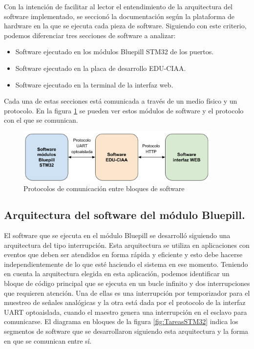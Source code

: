 Con la intención de facilitar al lector el entendimiento de la arquitectura del software implementado, se seccionó la documentación según la plataforma de hardware en la que se ejecuta cada pieza de software. Siguiendo con este criterio, podemos diferenciar tres secciones de software a analizar:
\begin{itemize}
	\item Software ejecutado en los módulos Bluepill STM32 de los puertos.
	\item Software ejecutado en la placa de desarrollo EDU-CIAA.
	\item Software ejecutado en la terminal de la interfaz web.
\end{itemize}
	
Cada una de estas secciones está comunicada a través de un medio físico y un protocolo. En la figura \ref{fig:ProtocolosComSoftware} se pueden ver estos módulos de software y el protocolo con el que se comunican.

\begin{figure}[H]
	\centering
	\includegraphics[width=0.9\textwidth]{./Figures/ProtocolosComSoftware.pdf}
	\caption{Protocolos de comunicación entre bloques de software}
	\label{fig:ProtocolosComSoftware}
\end{figure}

\subsection{Arquitectura del software del módulo Bluepill.}

El software que se ejecuta en el módulo Bluepill se desarrolló siguiendo una arquitectura del tipo interrupción. Esta arquitectura se utiliza en aplicaciones con eventos que deben ser atendidos en forma rápida y eficiente y esto debe hacerse independientemente de lo que esté haciendo el sistema en ese momento\citep{Patrones}.
Teniendo en cuenta la arquitectura elegida en esta aplicación, podemos identificar un bloque de código principal que se ejecuta en un bucle infinito y dos interrupciones que requieren atención. Una de ellas es una interrupción por temporizador para el muestreo de señales analógicas y la otra está dada por el protocolo de la interfaz UART optoaislada, cuando el maestro genera una interrupción en el esclavo para comunicarse.
El diagrama en bloques de la figura \ref{fig:TareasSTM32} indica los segmentos de software que se desarrollaron siguiendo esta arquitectura y la forma en que se comunican entre sí.

